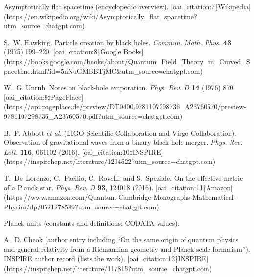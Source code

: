 \documentclass[12pt]{article}
\begin{document}
\begin{thebibliography}{99}
Asymptotically flat spacetime (encyclopedic overview).  [oai_citation:7‡Wikipedia](https://en.wikipedia.org/wiki/Asymptotically_flat_spacetime?utm_source=chatgpt.com)

S.~W. Hawking.
\newblock Particle creation by black holes.
\newblock \emph{Commun. Math. Phys.} \textbf{43} (1975) 199–220.  [oai_citation:8‡Google Books](https://books.google.com/books/about/Quantum_Field_Theory_in_Curved_Spacetime.html?id=5nNuGMBBTjMC&utm_source=chatgpt.com)

W.~G. Unruh.
\newblock Notes on black-hole evaporation.
\newblock \emph{Phys. Rev. D} \textbf{14} (1976) 870.  [oai_citation:9‡PagePlace](https://api.pageplace.de/preview/DT0400.9781107298736_A23760570/preview-9781107298736_A23760570.pdf?utm_source=chatgpt.com)

B.~P. Abbott \emph{et al.} (LIGO Scientific Collaboration and Virgo Collaboration).
\newblock Observation of gravitational waves from a binary black hole merger.
\newblock \emph{Phys. Rev. Lett.} \textbf{116}, 061102 (2016).  [oai_citation:10‡INSPIRE](https://inspirehep.net/literature/1204522?utm_source=chatgpt.com)

T.~De~Lorenzo, C.~Pacilio, C.~Rovelli, and S.~Speziale.
\newblock On the effective metric of a Planck star.
\newblock \emph{Phys. Rev. D} \textbf{93}, 124018 (2016).  [oai_citation:11‡Amazon](https://www.amazon.com/Quantum-Cambridge-Monographs-Mathematical-Physics/dp/0521278589?utm_source=chatgpt.com)

Planck units (constants and definitions; CODATA values). 

A.~D. Cheok (author entry including “On the same origin of quantum physics and general relativity from a Riemannian geometry and Planck scale formalism”).
\newblock INSPIRE author record (lists the work).  [oai_citation:12‡INSPIRE](https://inspirehep.net/literature/117815?utm_source=chatgpt.com)

\end{thebibliography}
\end{document}
